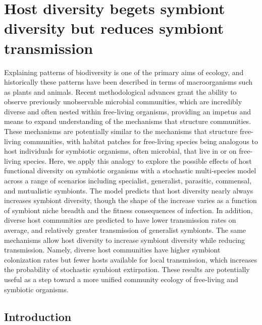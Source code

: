 \chapter{Host diversity begets symbiont diversity but reduces symbiont transmission}

Explaining patterns of biodiversity is one of the primary aims of ecology, and historically these patterns have been described in terms of macroorganisms such as plants and animals.
Recent methodological advances grant the ability to observe previously unobservable microbial communities, which are incredibly diverse and often nested within free-living organisms, providing an impetus and means to expand understanding of the mechanisms that structure communities.
These mechanisms are potentially similar to the mechanisms that structure free-living communities, with habitat patches for free-living species being analogous to host individuals for symbiotic organisms, often microbial, that live in or on free-living species.
Here, we apply this analogy to explore the possible effects of host functional diversity on symbiotic organisms with a stochastic multi-species model across a range of scenarios including specialist, generalist, parasitic, commensal, and mutualistic symbionts.
The model predicts that host diversity nearly always increases symbiont diversity, though the shape of the increase varies as a function of symbiont niche breadth and the fitness consequences of infection.
In addition, diverse host communities are predicted to have lower transmission rates on average, and relatively greater transmission of generalist symbionts.
The same mechanisms allow host diversity to increase symbiont diversity while reducing transmission.
Namely, diverse host communities have higher symbiont colonization rates but fewer hosts available for local transmission, which increases the probability of stochastic symbiont extirpation.
These results are potentially useful as a step toward a more unified community ecology of free-living and symbiotic organisms.

\section{Introduction}

